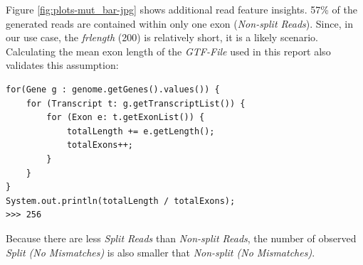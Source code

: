 \documentclass[12pt]{article}
\begin{document}
Figure \ref{fig:plots-mut_bar-jpg} shows additional read feature insights. 
57\% of the generated reads are contained within only one exon (\textit{Non-split Reads}).
Since, in our use case, the \textit{frlength} (200) is relatively short, it is a likely scenario.
Calculating the mean exon length of the \textit{GTF-File} used in this report also validates
this assumption:

\begin{verbatim}
for(Gene g : genome.getGenes().values()) {
    for (Transcript t: g.getTranscriptList()) {
        for (Exon e: t.getExonList()) {
            totalLength += e.getLength();
            totalExons++;
        }
    }
}
System.out.println(totalLength / totalExons);
>>> 256
\end{verbatim}
 
Because there are less \textit{Split Reads} than \textit{Non-split Reads}, the number of observed
\textit{Split (No Mismatches)} is also smaller that \textit{Non-split (No Mismatches)}.



\end{document}
